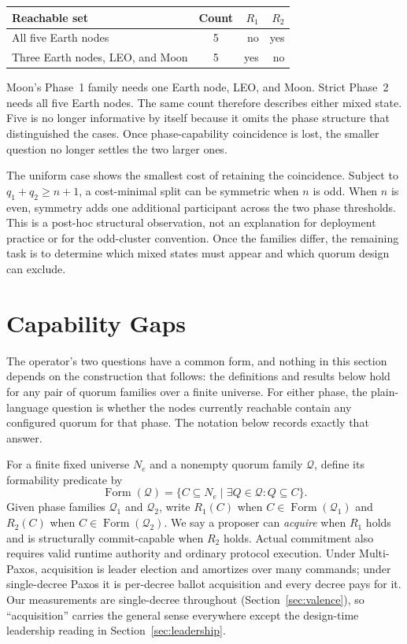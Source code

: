 \documentclass[letterpaper,twocolumn,10pt]{article}
\newcounter{prop}
\newcounter{cor}
\begin{document}
\begin{center}
\small
\begin{tabular}{lcrr}
\toprule
Reachable set & Count & $R_1$ & $R_2$ \\
\midrule
All five Earth nodes & 5 & no & yes \\
Three Earth nodes, LEO, and Moon & 5 & yes & no \\
\bottomrule
\end{tabular}
\end{center}

Moon's Phase~1 family needs one Earth node, LEO, and Moon. Strict Phase~2 needs all five Earth nodes. The same count therefore describes either mixed state. Five is no longer informative by itself because it omits the phase structure that distinguished the cases. Once phase-capability coincidence is lost, the smaller question no longer settles the two larger ones.

The uniform case shows the smallest cost of retaining the coincidence. Subject to $q_1+q_2 \ge n+1$, a cost-minimal split can be symmetric when $n$ is odd. When $n$ is even, symmetry adds one additional participant across the two phase thresholds. This is a post-hoc structural observation, not an explanation for deployment practice or for the odd-cluster convention. Once the families differ, the remaining task is to determine which mixed states must appear and which quorum design can exclude.

\section{Capability Gaps}
\label{sec:capability}

The operator's two questions have a common form, and nothing in this section depends on the construction that follows: the definitions and results below hold for any pair of quorum families over a finite universe. For either phase, the plain-language question is whether the nodes currently reachable contain any configured quorum for that phase. The notation below records exactly that answer.

For a finite fixed universe $N_e$ and a nonempty quorum family $\mathcal{Q}$, define its formability predicate by
\[
\operatorname{Form}(\mathcal{Q}) = \{C \subseteq N_e \mid \exists Q \in \mathcal{Q}: Q \subseteq C\}.
\]
Given phase families $\mathcal{Q}_1$ and $\mathcal{Q}_2$, write $R_1(C)$ when $C \in \operatorname{Form}(\mathcal{Q}_1)$ and $R_2(C)$ when $C \in \operatorname{Form}(\mathcal{Q}_2)$. We say a proposer can \emph{acquire} when $R_1$ holds and is structurally commit-capable when $R_2$ holds. Actual commitment also requires valid runtime authority and ordinary protocol execution. Under Multi-Paxos, acquisition is leader election and amortizes over many commands; under single-decree Paxos it is per-decree ballot acquisition and every decree pays for it. Our measurements are single-decree throughout (Section~\ref{sec:valence}), so ``acquisition'' carries the general sense everywhere except the design-time leadership reading in Section~\ref{sec:leadership}.
\end{document}
